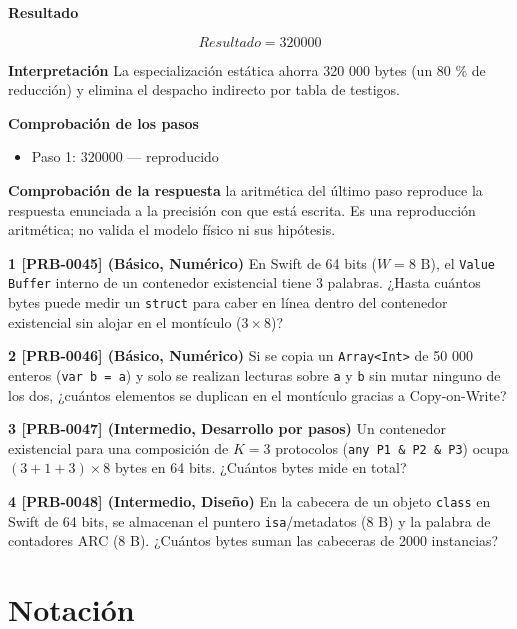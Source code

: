\documentclass{book}
\begin{document}
\begin{tcolorbox}[title={Problema resuelto}, studiumworked, breakable]
\noindent\textbf{Resultado}

\[
Resultado = 320000
\]

\noindent\textbf{Interpretación}
La especialización estática ahorra 320 000 bytes (un 80 \% de reducción) y elimina el despacho indirecto por tabla de testigos.

\noindent\textbf{Comprobación de los pasos}
\begin{itemize}
\item Paso 1: $320000$ — reproducido
\end{itemize}

\noindent\textbf{Comprobación de la respuesta} la aritmética del último paso reproduce la respuesta enunciada a la precisión con que está escrita. Es una reproducción aritmética; no valida el modelo físico ni sus hipótesis.
\end{tcolorbox}

\begin{tcolorbox}[title={Ejercicios}, studiumworked, breakable]

\noindent\textbf{1 [PRB-0045] (Básico, Numérico)}
En Swift de 64 bits (\(W = 8\text{ B}\)), el \texttt{Value Buffer} interno de un contenedor existencial tiene 3 palabras. ¿Hasta cuántos bytes puede medir un \texttt{struct} para caber en línea dentro del contenedor existencial sin alojar en el montículo (\(3 \times 8\))?

\noindent\textbf{2 [PRB-0046] (Básico, Numérico)}
Si se copia un \texttt{Array<Int>} de 50 000 enteros (\texttt{var b = a}) y solo se realizan lecturas sobre \texttt{a} y \texttt{b} sin mutar ninguno de los dos, ¿cuántos elementos se duplican en el montículo gracias a Copy-on-Write?

\noindent\textbf{3 [PRB-0047] (Intermedio, Desarrollo por pasos)}
Un contenedor existencial para una composición de \(K = 3\) protocolos (\texttt{any P1 \& P2 \& P3}) ocupa \((3 + 1 + 3) \times 8\) bytes en 64 bits. ¿Cuántos bytes mide en total?

\noindent\textbf{4 [PRB-0048] (Intermedio, Diseño)}
En la cabecera de un objeto \texttt{class} en Swift de 64 bits, se almacenan el puntero \texttt{isa}/metadatos (8 B) y la palabra de contadores ARC (8 B). ¿Cuántos bytes suman las cabeceras de 2000 instancias?
\end{tcolorbox}
\appendix
\chapter{Notación}
\end{document}
